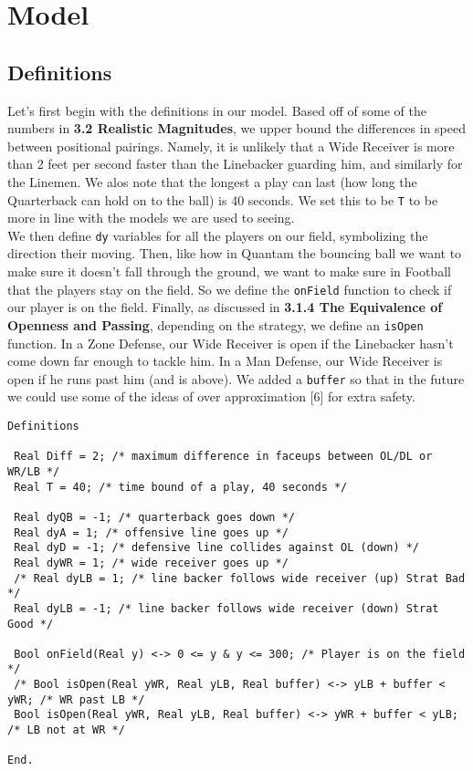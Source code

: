 \newpage


\section{Model}

\subsection{Definitions}

\quad Let's first begin with the definitions in our model. Based off of some of the numbers in \textbf{3.2 Realistic Magnitudes}, we upper bound the differences in speed between positional pairings. Namely, it is unlikely that a Wide Receiver is more than 2 feet per second faster than the Linebacker guarding him, and similarly for the Linemen. We alos note that the longest a play can last (how long the Quarterback can hold on to the ball) is 40 seconds. We set this to be \texttt{T} to be more in line with the models we are used to seeing. \\

We then define \texttt{dy} variables for all the players on our field, symbolizing the direction their moving. Then, like how in Quantam the bouncing ball we want to make sure it doesn't fall through the ground, we want to make sure in Football that the players stay on the field. So we define the \texttt{onField} function to check if our player is on the field. Finally, as discussed in \textbf{3.1.4 The Equivalence of Openness and Passing}, depending on the strategy, we define an \texttt{isOpen} function. In a Zone Defense, our Wide Receiver is open if the Linebacker hasn't come down far enough to tackle him. In a Man Defense, our Wide Receiver is open if he runs past him (and is above). We added a \texttt{buffer} so that in the future we could use some of the ideas of over approximation [6] for extra safety. 

\begin{lstlisting}
Definitions

 Real Diff = 2; /* maximum difference in faceups between OL/DL or WR/LB */
 Real T = 40; /* time bound of a play, 40 seconds */
 
 Real dyQB = -1; /* quarterback goes down */
 Real dyA = 1; /* offensive line goes up */
 Real dyD = -1; /* defensive line collides against OL (down) */
 Real dyWR = 1; /* wide receiver goes up */
 /* Real dyLB = 1; /* line backer follows wide receiver (up) Strat Bad */
 Real dyLB = -1; /* line backer follows wide receiver (down) Strat Good */
 
 Bool onField(Real y) <-> 0 <= y & y <= 300; /* Player is on the field */
 /* Bool isOpen(Real yWR, Real yLB, Real buffer) <-> yLB + buffer < yWR; /* WR past LB */
 Bool isOpen(Real yWR, Real yLB, Real buffer) <-> yWR + buffer < yLB; /* LB not at WR */
 
End.
\end{lstlisting}

